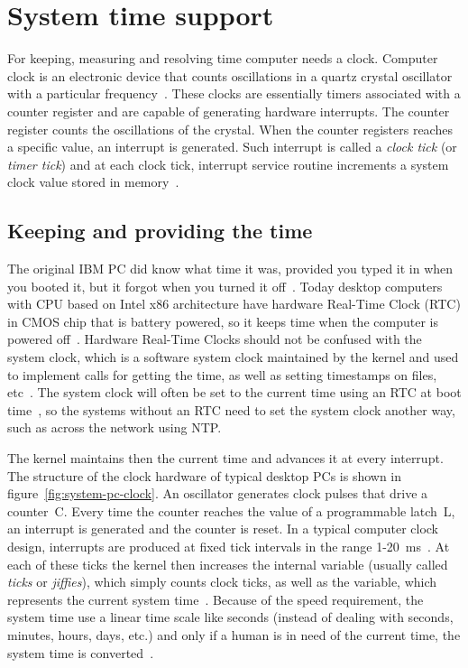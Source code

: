 
\chapter{System time support}
For keeping, measuring and resolving time computer needs a clock.
Computer clock is an electronic device that counts oscillations in a
quartz crystal oscillator with a particular frequency~\cite{thesis-sync}.
These clocks are essentially timers associated with a counter register and
are capable of generating hardware interrupts.
The counter register counts the oscillations of the crystal.
When the counter registers reaches a specific value,
an interrupt is generated.
Such interrupt is called a {\it{clock tick}} (or {\it{timer tick}}) and at each clock tick,
interrupt service routine increments a system clock value stored in memory~\cite{thesis-sync}.

\section{Keeping and providing the time}\label{sec:system-keeping-and-providing}
The original IBM PC did know what time it was, provided you typed it in when you booted it,
but it forgot when you turned it off~\cite{timecounters}.
Today desktop computers with CPU based on Intel x86 architecture
have hardware Real-Time Clock (RTC) in CMOS chip that is battery powered,
so it keeps time when the computer is powered off~\cite{timecounters}.
Hardware Real-Time Clocks should not be confused with the system clock,
which is a software system clock maintained by
the kernel and used to implement calls for getting the time,
as well as setting timestamps on files, etc~\cite{linux-man-rtc}.
The system clock will often be set to the current time using an RTC at boot time~\cite{linux-man-rtc},
so the systems without an RTC need to set the system clock another way,
such as across the network using NTP.

The kernel maintains then the current time and advances it at every interrupt.
The structure of the clock hardware of
typical desktop PCs is shown in figure~\ref{fig:system-pc-clock}.
An oscillator generates clock pulses that drive a counter~C.
Every time the counter reaches the value of a programmable latch~L,
an interrupt is generated and the counter is reset.
In a typical computer clock design, interrupts are produced at
fixed tick intervals in the range 1-20~ms~\cite{nanokernel}.
At each of these ticks the kernel then increases the internal variable
(usually called {\it{ticks}} or {\it{jiffies}}), which simply counts clock ticks,
as well as the variable, which represents the current system time~\cite{thesis-beat}.
Because of the speed requirement,
the system time use a linear time scale like seconds
(instead of dealing with seconds, minutes, hours, days, etc.)
and only if a human is in need of the current time,
the system time is converted~\cite{ntp-faq}.

